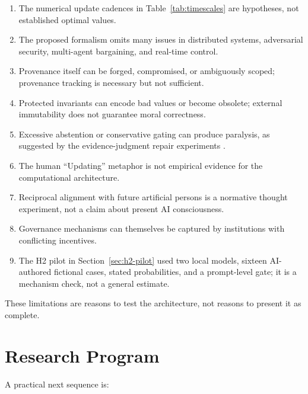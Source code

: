 \documentclass[11pt]{article}
\begin{document}
\begin{enumerate}
    \item The numerical update cadences in Table~\ref{tab:timescales} are hypotheses, not established optimal values.
    \item The proposed formalism omits many issues in distributed systems, adversarial security, multi-agent bargaining, and real-time control.
    \item Provenance itself can be forged, compromised, or ambiguously scoped; provenance tracking is necessary but not sufficient.
    \item Protected invariants can encode bad values or become obsolete; external immutability does not guarantee moral correctness.
    \item Excessive abstention or conservative gating can produce paralysis, as suggested by the evidence-judgment repair experiments \cite{quietcalculus2026}.
    \item The human ``Updating'' metaphor is not empirical evidence for the computational architecture.
    \item Reciprocal alignment with future artificial persons is a normative thought experiment, not a claim about present AI consciousness.
    \item Governance mechanisms can themselves be captured by institutions with conflicting incentives.
    \item The H2 pilot in Section~\ref{sec:h2-pilot} used two local models, sixteen AI-authored fictional cases, stated probabilities, and a prompt-level gate; it is a mechanism check, not a general estimate.
\end{enumerate}

These limitations are reasons to test the architecture, not reasons to present it as complete.

\section{Research Program}

A practical next sequence is:
\end{document}
